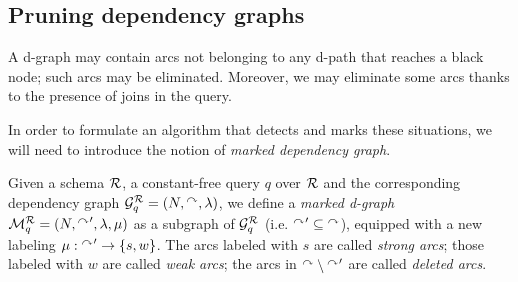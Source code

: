 \subsection{Pruning dependency graphs}\label{subsec:pruning}

A d-graph may contain arcs not belonging to any d-path that reaches a black node; such arcs may be eliminated. Moreover, we may eliminate some arcs thanks to the presence of joins in the query.

In order to formulate an algorithm that detects and marks these situations, we will need to introduce the notion of \emph{marked dependency graph}.
\begin{definition}\label{def:marked}
    Given a schema $\mathcal{R}$, a constant-free query $q$ over $\mathcal{R}$ and the corresponding dependency graph $\mathcal{G}_q^{\mathcal{R}} = (N, \mbox{$^{\curvearrowright}$}, \lambda)$, we define a \emph{marked d-graph} $\mathcal{M}_q^{\mathcal{R}} = (N, \mbox{$^{\curvearrowright}$}', \lambda, \mu)$ as a subgraph of $\mathcal{G}_q^{\mathcal{R}}$ (i.e. $\mbox{$^{\curvearrowright}$}' \subseteq \mbox{$^{\curvearrowright}$}$), equipped with a new labeling $\mu : \mbox{$^{\curvearrowright}$}' \to \{ s, w \}$. The arcs labeled with $s$ are called \emph{strong arcs}; those labeled with $w$ are called \emph{weak arcs}; the arcs in $\mbox{$^{\curvearrowright}$} \setminus \mbox{$^{\curvearrowright}$}'$ are called \emph{deleted arcs}.
\end{definition}

